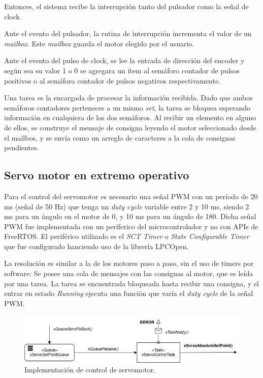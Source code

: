 \documentclass{IEEEtran}
\begin{document}
Entonces, el sistema recibe la interrupción tanto del pulsador como la señal de clock.

Ante el evento del pulsador, la rutina de interrupción incrementa el valor de un \textit{mailbox}. Este \textit{mailbox} guarda el motor elegido por el usuario.

Ante el evento del pulso de clock, se lee la entrada de dirección del encoder y según sea su valor 1 o 0 se agregara un ítem al semáforo contador de pulsos positivos o al semáforo contador de pulsos negativos respectivamente.

Una tarea es la encargada de procesar la información recibida. Dado que ambos semáforos contadores perteneces a un mismo \textit{set}, la tarea se bloquea esperando información en cualquiera de los dos semáforos. Al recibir un elemento en alguno de ellos, se construye el mensaje de consigna leyendo el motor seleccionado desde el mailbos, y se envía como un arreglo de caracteres a la cola de consignas pendientes.

\subsection{Servo motor en extremo operativo}
Para el control del servomotor es necesario una señal PWM con un período de 20 ms (señal de 50 Hz) que tenga un \textit{duty cycle} variable entre 2 y 10 ms, siendo 2 ms para un ángulo en el motor de 0\degree, y 10 ms para un ángulo de 180\degree. Dicha señal PWM fue implementada con un períferico del microcontrolador y no con APIs de FreeRTOS. El periférico utilizado es el \textit{SCT Timer} o \textit{State Configurable Timer} que fue configurado hanciendo uso de la librería LPCOpen.

La resolución es similar a la de los motores paso a paso, sin el uso de timers por software: Se posee una cola de mensajes con las consignas al motor, que es leída por una tarea. La tarea se encuentrada bloqueada hasta recibir una consigna, y el entrar en estado \textit{Running} ejecuta una función que varía el \textit{duty cycle} de la señal PWM.

\begin{figure}[ht]
    \centering
    \includegraphics[scale=0.5]{../diagrama_servo.png}
    \caption{Implementación de control de servomotor.}
    \label{fig:diagrama-servo}
\end{figure}
\end{document}
